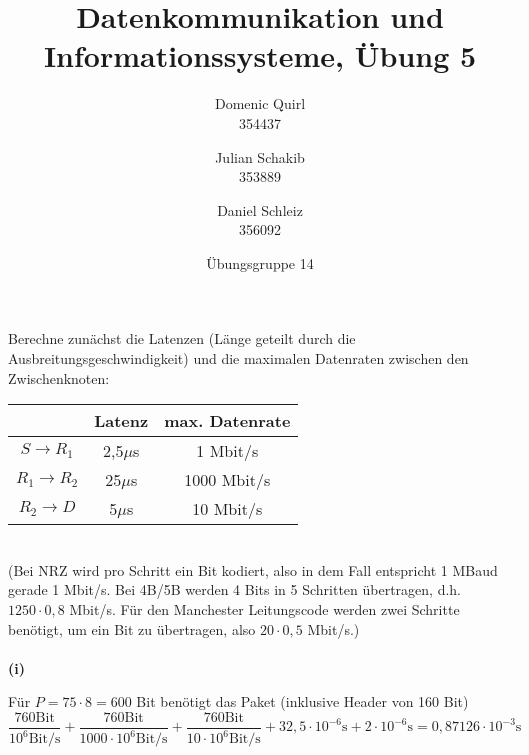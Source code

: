 \documentclass{../exercisesheet}
\title{Datenkommunikation und Informationssysteme, Übung 5}
\author{
    Domenic Quirl \\ 354437
    \and
    Julian Schakib \\ 353889
    \and 
    Daniel Schleiz \\ 356092
}
\date{Übungsgruppe 14}
\begin{document}
\maketitle
\pointtable


\begin{exercise}{4}
\begin{subexercise}

\end{subexercise}
\begin{subexercise}

\end{subexercise}
\begin{subexercise}

\end{subexercise}
\end{exercise}


\begin{exercise}{5}
\begin{subexercise}
Berechne zunächst die Latenzen (Länge geteilt durch die Ausbreitungsgeschwindigkeit) und die maximalen Datenraten zwischen den Zwischenknoten:\\
\begin{table}[h]
\centering
\begin{tabular}{c|c|c}
 & Latenz & max. Datenrate \\ \hline
$S\rightarrow R_1$      & 2,5$\mu$s & 1 Mbit/s \\ \hline
$R_1 \rightarrow R_2$ & 25$\mu$s & 1000 Mbit/s \\ \hline
$R_2 \rightarrow D$     & 5$\mu$s & 10 Mbit/s
\end{tabular}
\end{table}\\
(Bei NRZ wird pro Schritt ein Bit kodiert, also in dem Fall  entspricht 1 MBaud gerade 1 Mbit/s. Bei 4B/5B werden 4 Bits in 5 Schritten übertragen, d.h. $1250 \cdot 0,8$ Mbit/s. Für den
Manchester Leitungscode werden zwei Schritte benötigt, um ein Bit zu übertragen, also $20 \cdot 0,5$ Mbit/s.)\\ \ \\
\textbf{(i)}
\begin{adjustwidth}{2em}{0em}\vspace{-\baselineskip}
Für $P=75 \cdot 8=600$ Bit benötigt das Paket (inklusive Header von 160 Bit)
\[
\frac{760 \text{Bit}}{10^6 \text{Bit/s}} + \frac{760 \text{Bit}}{1000 \cdot 10^6 \text{Bit/s}} + \frac{760 \text{Bit}}{10 \cdot 10^6 \text{Bit/s}} + 32,5 \cdot 10^{-6}\text{s} + 
2 \cdot 10^{-6}\text{s} = 0,87126 \cdot 10^{-3}\text{s}
\]
\end{adjustwidth}
\end{subexercise}
\end{exercise}
\end{document}
